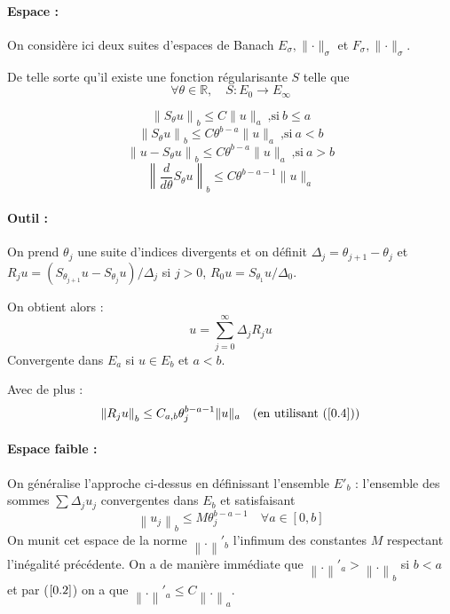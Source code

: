 \documentclass[11pt,a4paper]{article}
\begin{document}
\paragraph{Espace :}
On considère ici deux suites d'espaces de Banach $E_\sigma, \lVert \cdot \rVert_\sigma$ et $F_\sigma, \lVert \cdot \rVert_\sigma$.

De telle sorte qu'il existe une fonction régularisante $S$ telle que 
\[
\forall \theta \in \mathbb{R}, \quad S : E_0 \to E_\infty 
\]

\begin{equation}\label{0.1}
\left\|S_\theta u\right\|_b \leq C\|u\|_a \ \text{,si}  \:  b \leq a 
\end{equation}
\begin{equation}\label{0.2}
\left\|S_\theta u\right\|_b \leq C \theta^{b-a}\|u\|_a  \ \text{,si}  \: a < b
\end{equation}
\begin{equation}\label{0.3}
\left\|u-S_\theta u\right\|_b \leq C \theta^{b-a}\|u\|_a \ \text{,si}  \:a > b
\end{equation}
\begin{equation}\label{0.4}
\left\|\frac{d}{d \theta} S_\theta u\right\|_b \leq C \theta^{b-a-1}\|u\|_a 
\end{equation}
	

\paragraph{Outil :}
On prend $\theta_j$ une suite d'indices divergents et on définit $\Delta_j = \theta_{j+1} - \theta_j$ et $R_j u = \left(S_{\theta_{j+1}} u - S_{\theta_j} u\right) / \Delta_j$ si $j > 0$, $R_0 u = S_{\theta_1} u / \Delta_0$.

On obtient alors :
\[ 
u = \sum_{j=0}^{\infty} \Delta_j R_j u 
\]
Convergente dans $E_a$ si $u \in E_b$ et $a < b$.

Avec de plus :
\begin{equation}\label{5} 
\left\|R_j u\right\|_b \leq C_{a, b} \theta_j^{b-a-1}\|u\|_a \quad (\text{en utilisant } (\ref{0.4}))
\end{equation}
\paragraph{Espace faible :}
On généralise l'approche ci-dessus en définissant l'ensemble $E'_b$ : l'ensemble des sommes $\sum \Delta_j u_j$ convergentes dans $E_b$ et satisfaisant 
\[ 
\left\|u_j \right\|_b \leq M \theta_j^{b-a-1} \quad \forall a \in [0,b] 
\]  
On munit cet espace de la norme $\left\|. \right\|'_b$ l'infimum des constantes $M$ respectant l'inégalité précédente.
On a de manière immédiate que $\left\|. \right\|'_a > \left\|. \right\|_b$ si $b < a$ et par ($\ref{0.2}$) on a que $\left\|. \right\|'_a \leq C \left\|. \right\|_a$.
\end{document}
